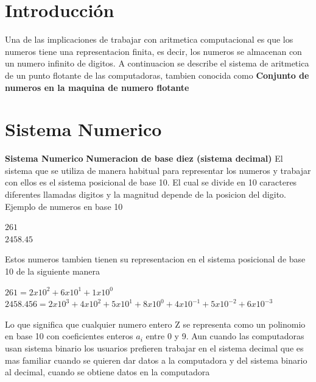 \documentclass{article}
\begin{document}
\begin{multicols}{2}

  

\section{Introducción}
\label{sec:intro}
Una de las implicaciones de trabajar con aritmetica computacional es que los numeros tiene una representacion finita, es decir, los numeros se almacenan con un numero infinito de digitos.
A continuacion se describe el sistema de aritmetica de un punto flotante de las computadoras, tambien conocida como \textbf{Conjunto de numeros en la maquina de numero flotante} 

\section{Sistema Numerico}
\label{sec:Sis}
\textbf{Sistema Numerico}
\textbf{Numeracion de base diez (sistema decimal)}
El sistema que se utiliza de manera habitual para representar los numeros y trabajar con ellos es el sistema posicional de base 10. El cual se divide en 10 caracteres diferentes llamadas digitos y la magnitud depende de la posicion del digito.
Ejemplo de numeros en base 10 \\
\begin{center}
$261$ \\
$2458.45$\\
\end{center}
Estos numeros tambien tienen su representacion en el sistema posicional de base 10 de la siguiente manera
\begin{center}
$261=2x10^{2}+6x10^{1}+1x10^0$
\\
$2458.456=2x10^{3}+4x10^{2}+5x10^1+8x10^{0}+4x10^{-1}+5x10^{-2}+6x10^{-3}$
\\
\end{center}
Lo que significa que cualquier numero entero Z se representa como un polinomio en base 10 con coeficientes enteros $a_{i}$ entre 0 y 9.
Aun cuando las computadoras usan sistema binario los usuarios prefieren trabajar en el sistema decimal que es mas familiar cuando se quieren dar datos a la computadora y del sistema binario al decimal, cuando se obtiene datos en la computadora

\end{multicols}
\end{document}
